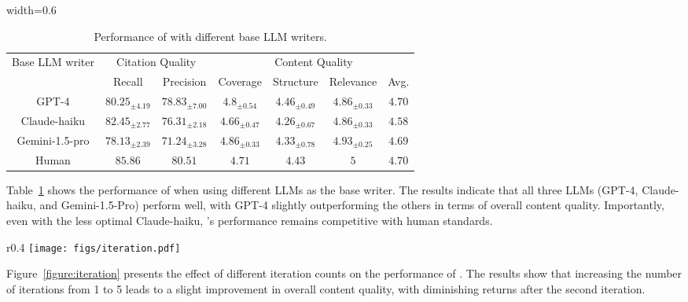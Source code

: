 \begin{table}[th!]
\centering
\caption{Performance of \ourmethod with different base LLM writers.}
\label{table:llm-writer}
\begin{adjustbox}{width=0.6\textwidth}
\begin{tabular}{ccc|cccc}
\toprule
 
 \multirow{2}{*}{Base LLM writer} & \multicolumn{2}{c|}{Citation Quality} & \multicolumn{4}{c}{Content Quality} \\ 
& Recall & Precision & Coverage & Structure & Relevance & Avg.  \\ \midrule
   GPT-4 &$80.25_{\pm 4.19}$ & $78.83_{\pm 7.00}$   & $4.8 _{\pm 0.54}$    & $4.46_{\pm 0.49}$      & $4.86_{\pm 0.33}$      & $4.70$             \\
    Claude-haiku     & $82.45_{\pm 2.77}$ & $76.31_{\pm 2.18}$    & $4.66_{\pm 0.47}$     &$4.26_{\pm 0.67}$     & $4.86_{\pm  0.33}$     &$4.58$                   \\
    Gemini-1.5-pro    &$78.13_{\pm 2.39}$ & $71.24_{\pm 3.28}$         & $4.86_{\pm 0.33}$   
    & $4.33_{\pm 0.78}$      & $4.93_{\pm 0.25}$      & $4.69$                   \\ \midrule
     Human    &$85.86$ & $80.51$         & $4.71$   
    & $4.43$      & $5$      & $4.70$  \\
\bottomrule
\end{tabular}
\end{adjustbox}
\end{table}

Table~\ref{table:llm-writer} shows the performance of \ourmethod when using different LLMs as the base writer. The results indicate that all three LLMs (GPT-4, Claude-haiku, and Gemini-1.5-Pro) perform well, with GPT-4 slightly outperforming the others in terms of overall content quality. Importantly, even with the less optimal Claude-haiku, \ourmethod's performance remains competitive with human standards.

\begin{wrapfigure}{r}{0.4\textwidth} 
    \centering
    \texttt{[image: figs/iteration.pdf]}
    \caption{Impact of Iteration on AutoSurvey Performance.}
    \label{figure:iteration}
\end{wrapfigure}

Figure~\ref{figure:iteration} presents the effect of different iteration counts on the performance of \ourmethod. The results show that increasing the number of iterations from 1 to 5 leads to a slight improvement in overall content quality, with diminishing returns after the second iteration.


